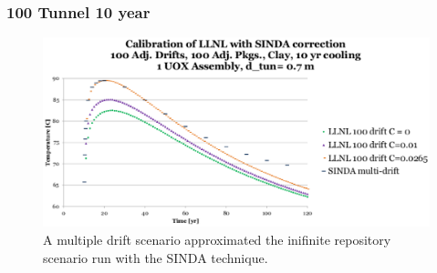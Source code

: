\begin{frame}[ctb!]
  \frametitle{100 Tunnel 10 year}
  \begin{figure}[h]
    \begin{center}
      \includegraphics[width=.8\textwidth]{100drift10yr.eps}
      \caption{A multiple drift scenario approximated the inifinite repository 
      scenario run with the SINDA technique.}
    \end{center}
    \label{fig:100drift10yr}
  \end{figure}
\end{frame}

